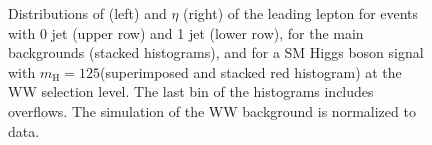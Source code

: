 \begin{figure}
{}
\caption{Distributions of \pt (left) and $\eta$ (right) of the leading lepton for events with 0 jet (upper row) and 1 jet (lower row), for the main backgrounds (stacked histograms), and for a SM Higgs boson signal with $m_\mathrm{H}=125$\GeV (superimposed and stacked red histogram) at the WW selection level. The last bin of the histograms includes overflows. The simulation of the WW background is normalized to data.}\label{fig:distr1}
\end{figure}

